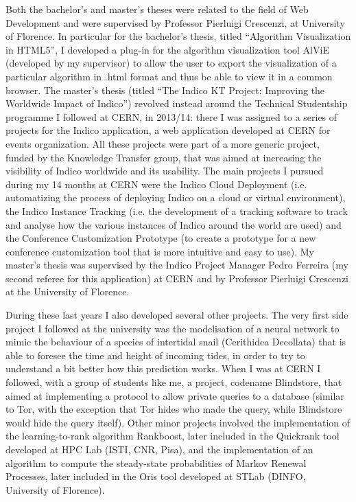 \documentclass{article}
\begin{document}
    Both the bachelor's and master's theses were related to the field of Web Development and were supervised by Professor Pierluigi Crescenzi, at University of Florence. In particular for the bachelor's thesis, titled ``Algorithm Visualization in HTML5'', I developed a plug-in for the algorithm visualization tool AlViE (developed by my supervisor) to allow the user to export the visualization of a particular algorithm in .html format and thus be able to view it in a common browser. The master's thesis (titled ``The Indico KT Project: Improving the Worldwide Impact of Indico'') revolved instead around the Technical Studentship programme I followed at CERN, in 2013/14: there I was assigned to a series of projects for the Indico application, a web application developed at CERN for events organization. All these projects were part of a more generic project, funded by the Knowledge Transfer group, that was aimed at increasing the visibility of Indico worldwide and its usability. The main projects I pursued during my 14 months at CERN were the Indico Cloud Deployment (i.e. automatizing the process of deploying Indico on a cloud or virtual environment), the Indico Instance Tracking (i.e. the development of a tracking software to track and analyse how the various instances of Indico around the world are used) and the Conference Customization Prototype (to create a prototype for a new conference customization tool that is more intuitive and easy to use). My master's thesis was supervised by the Indico Project Manager Pedro Ferreira (my second referee for this application) at CERN and by Professor Pierluigi Crescenzi at the University of Florence. \par \bigskip
    
    During these last years I also developed several other projects. The very first side project I followed at the university was the modelisation of a neural network to mimic the behaviour of a species of intertidal snail (Cerithidea Decollata) that is able to foresee the time and height of incoming tides, in order to try to understand a bit better how this prediction works. When I was at CERN I followed, with a group of students like me, a project, codename Blindstore, that aimed at implementing a protocol to allow private queries to a database (similar to Tor, with the exception that Tor hides who made the query, while Blindstore would hide the query itself). Other minor projects involved the implementation of the learning-to-rank algorithm Rankboost, later included in the Quickrank tool developed at HPC Lab (ISTI, CNR, Pisa), and the implementation of an algorithm to compute the steady-state probabilities of Markov Renewal Processes, later included in the Oris tool developed at STLab (DINFO, University of Florence). \par \bigskip
    
\end{document}
